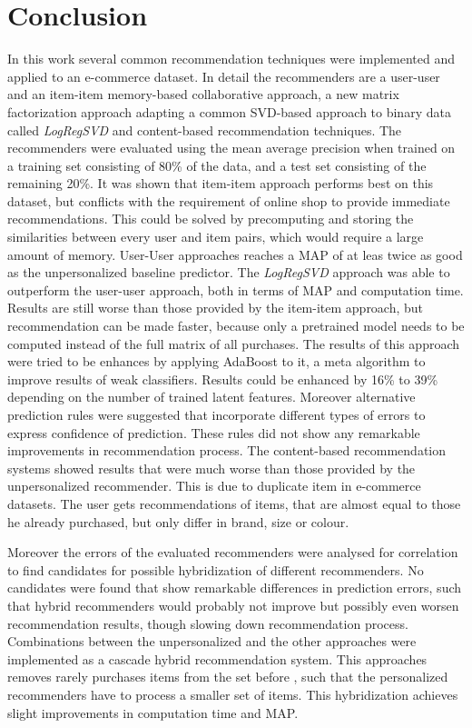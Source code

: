 \documentclass[10pt]{reportMaster}
\begin{document}
\chapter{Conclusion}
\label{chap:conclusionAndFutureWork}
In this work several common recommendation techniques were implemented and applied to an e-commerce dataset.
In detail the recommenders are a user-user and an item-item memory-based collaborative approach, a new matrix factorization approach adapting a common SVD-based approach to binary data called \textit{LogRegSVD} and content-based recommendation techniques.
The recommenders were evaluated using the mean average precision when trained on a training set consisting of 80\% of the data, and a test set consisting of the remaining 20\%.
It was shown that item-item approach performs best on this dataset, but conflicts with the requirement of online shop to provide immediate recommendations.
This could be solved by precomputing and storing the similarities between every user and item pairs, which would require a large amount of memory.
User-User approaches reaches a MAP of at leas twice as good as the unpersonalized baseline predictor.
The \textit{LogRegSVD} approach was able to outperform the user-user approach, both in terms of MAP and computation time.
Results are still worse than those provided by the item-item approach, but recommendation can be made faster, because only a pretrained model needs to be computed instead of the full matrix of all purchases.
The results of this approach were tried to be enhances by applying AdaBoost to it, a meta algorithm to improve results of weak classifiers.
Results could be enhanced by 16\% to 39\% depending on the number of trained latent features.
Moreover alternative prediction rules were suggested that incorporate different types of errors to express confidence of prediction.
These rules did not show any remarkable improvements in recommendation process.
The content-based recommendation systems showed results that were much worse than those provided by the unpersonalized recommender.
This is due to duplicate item in e-commerce datasets.
The user gets recommendations of items, that are almost equal to those he already purchased, but only differ in brand, size or colour.

Moreover the errors of the evaluated recommenders were analysed for correlation to find candidates for possible hybridization of different recommenders.
No candidates were found that show remarkable differences in prediction errors, such that hybrid recommenders would probably not improve but possibly even worsen recommendation results, though slowing down recommendation process.
Combinations between the unpersonalized and the other approaches were implemented as a cascade hybrid recommendation system.
This approaches removes rarely purchases items from the set before , such that the personalized recommenders have to process a smaller set of items.
This hybridization achieves slight improvements in computation time and MAP.







\end{document}
